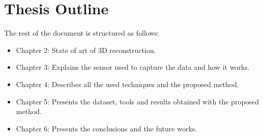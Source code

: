 \section{Thesis Outline}

The rest of the document is structured as follows:

\begin{itemize}
\item Chapter 2: State of art of 3D reconstruction. 

\item Chapter 3: Explains the sensor used to capture the data and how it works.

\item Chapter 4: Describes all the used techniques and the proposed method.

\item Chapter 5: Presents the dataset, tools and results obtained with the proposed method.

\item Chapter 6: Presents the conclusions and the future works.
\end{itemize}

